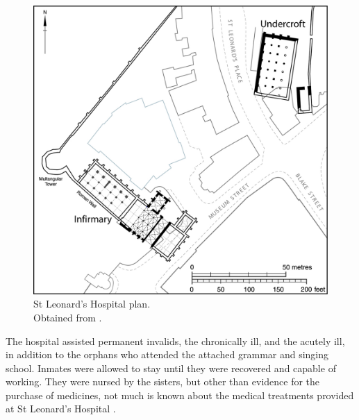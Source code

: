 \documentclass[%
	]{ijsra}
\begin{document}
 	\begin{figure}
 		\includegraphics[width=\linewidth]{figures/Pereda-Figure01}
 		\caption{St Leonard’s Hospital plan.
    {\normalfont\scriptsize \\ Obtained from \textcite[100, fig. 37]{Thomas_2002}.
              }}
 		\label{fig:Pereda-Figure01}
 	\end{figure}
 
 The hospital assisted permanent invalids, the chronically ill, and the acutely ill, in addition to the orphans who attended the attached grammar and singing school. Inmates were allowed to stay until they were recovered and capable of working. They were nursed by the sisters, but other than evidence for the purchase of medicines, not much is known about the medical treatments provided at St Leonard’s Hospital \parencites[5,12-15]{Cullum_1991}[21]{Dainton_1961}[97]{Dean_2008}[134]{Goldberg_1992}{Page_1974}[78,109]{Palliser_2014}.
 
\end{document}
